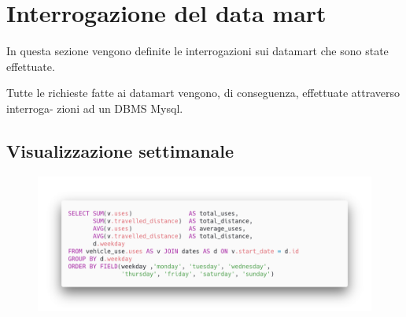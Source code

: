 \chapter{Interrogazione del data mart}
In questa sezione vengono definite le interrogazioni sui datamart che sono state effettuate.

Tutte le richieste fatte ai datamart vengono, di conseguenza, effettuate attraverso interroga-
zioni ad un DBMS Mysql.

\section{Visualizzazione settimanale}

\begin{figure}[H]                                                                                                                                                            
\centering                                                                                                                                                                   
\includegraphics[width=\textwidth]{images/query1}                                                                                                                                   
\label{fig:query1}                                                                                                                                                           
\end{figure}


